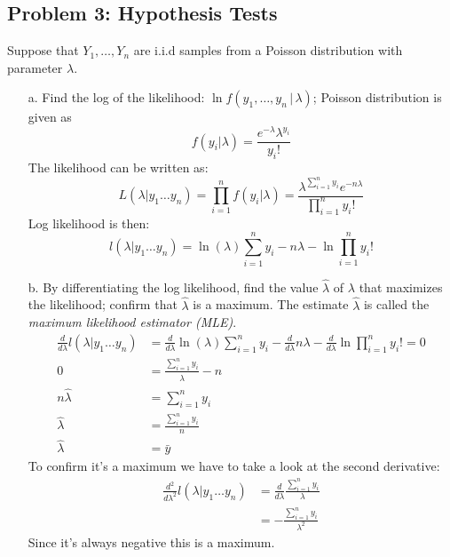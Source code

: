 \documentclass{article}
\newcommand{\1}{\mathbf{1}}
\begin{document}
\newpage
\subsection*{Problem 3: Hypothesis Tests}

Suppose that $Y_1,\ldots ,Y_n$ are i.i.d samples from a Poisson distribution with parameter $\lambda$. 
\begin{itemize}
    \item[a.] Find the log of the likelihood: $\ln f(y_1,\ldots ,y_n\,|\, \lambda)$;
    Poisson distribution is given as 
    $$ f(y_i|\lambda) = \frac{e^{-\lambda} \lambda^{y_i}}{y_i!} $$
    The likelihood can be written as:
    $$L(\lambda|y_1\hdots y_n) = \prod_{i=1}^n f(y_i|\lambda)  = \frac{\lambda^{\sum_{i=1}^n y_i} e^{-n\lambda}}{\prod_{i=1}^n y_i!}$$
    Log likelihood is then:
    $$ l(\lambda|y_1\hdots y_n) = \ln(\lambda)\sum_{i=1}^n y_i - n\lambda - \ln \prod_{i=1}^n y_i! $$ 
    
    \item[b.] By differentiating the log likelihood, find the value $\hat{\lambda}$ of $\lambda$ that maximizes the likelihood; confirm that $\hat{\lambda}$ is a maximum. The estimate  $\hat{\lambda}$  is called the {\it maximum likelihood estimator (MLE)}.
    \begin{align*}
        \frac{d}{d\lambda} l(\lambda|y_1\hdots y_n) &= \frac{d}{d\lambda}\ln(\lambda)\sum_{i=1}^n y_i - \frac{d}{d\lambda}n\lambda - \frac{d}{d\lambda}\ln \prod_{i=1}^n y_i! = 0 \\
         0 &= \frac{\sum_{i=1}^n y_i}{\hat\lambda} - n \\
         n\hat\lambda &= \sum_{i=1}^n y_i  \\
         \hat\lambda &= \frac{\sum_{i=1}^n y_i}{n} \\
         \hat\lambda &= \bar y
    \end{align*}
    To confirm it's a maximum we have to take a look at the second derivative:
    \begin{align*}
        \frac{d^2}{d\lambda^2} l(\lambda|y_1\hdots y_n) &= \frac{d}{d\lambda} \frac{\sum_{i=1}^n y_i}{\lambda} \\
        &= - \frac{\sum_{i=1}^n y_i}{\lambda^2}
    \end{align*}
    Since it's always negative this is a maximum. 
\end{itemize}
\end{document}
